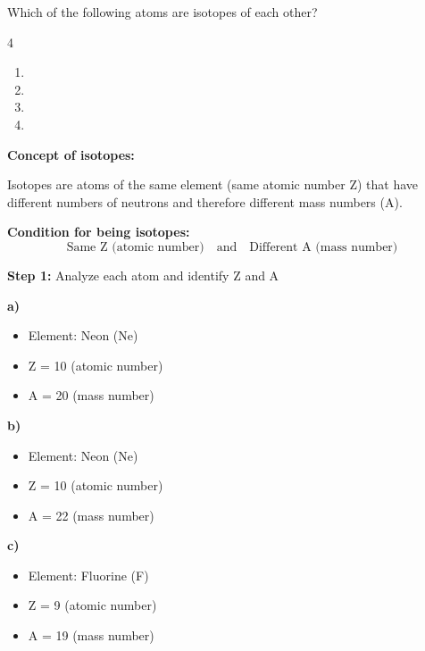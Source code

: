 \begin{exercise}
    Which of the following atoms are isotopes of each other?
    \begin{multicols}{4}
        \begin{enumerate}[label=\letraminuscula]
        \item {}
        \item {}
        \item {}
        \item {}
        \end{enumerate}
    \end{multicols}
    \begin{solu}
        \textbf{Concept of isotopes:}

        Isotopes are atoms of the same element (same atomic number Z) that have different numbers of neutrons and therefore different mass numbers (A).

        \textbf{Condition for being isotopes:}
        \[
            \text{Same Z (atomic number)} \quad \text{and} \quad \text{Different A (mass number)}
        \]

        \textbf{Step 1:} Analyze each atom and identify Z and A

        \textbf{a) }
        \begin{itemize}
            \item Element: Neon (Ne)
            \item Z = 10 (atomic number)
            \item A = 20 (mass number)
        \end{itemize}

        \textbf{b) }
        \begin{itemize}
            \item Element: Neon (Ne)
            \item Z = 10 (atomic number)
            \item A = 22 (mass number)
        \end{itemize}

        \textbf{c) }
        \begin{itemize}
            \item Element: Fluorine (F)
            \item Z = 9 (atomic number)
            \item A = 19 (mass number)
        \end{itemize}


\end{solu}
\end{exercise}
